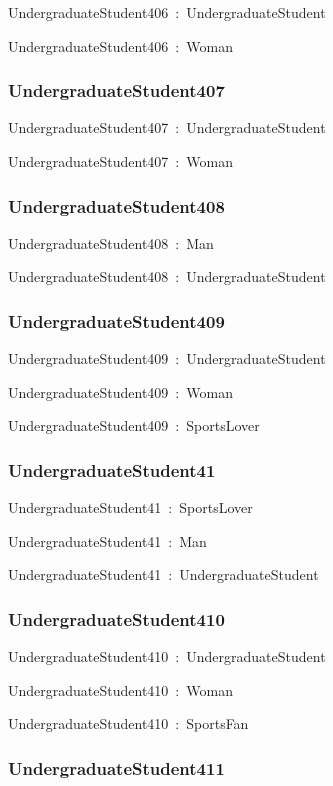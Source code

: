 \documentclass{article}
\begin{document}
UndergraduateStudent406~:~UndergraduateStudent

UndergraduateStudent406~:~Woman

\subsubsection*{UndergraduateStudent407}

UndergraduateStudent407~:~UndergraduateStudent

UndergraduateStudent407~:~Woman

\subsubsection*{UndergraduateStudent408}

UndergraduateStudent408~:~Man

UndergraduateStudent408~:~UndergraduateStudent

\subsubsection*{UndergraduateStudent409}

UndergraduateStudent409~:~UndergraduateStudent

UndergraduateStudent409~:~Woman

UndergraduateStudent409~:~SportsLover

\subsubsection*{UndergraduateStudent41}

UndergraduateStudent41~:~SportsLover

UndergraduateStudent41~:~Man

UndergraduateStudent41~:~UndergraduateStudent

\subsubsection*{UndergraduateStudent410}

UndergraduateStudent410~:~UndergraduateStudent

UndergraduateStudent410~:~Woman

UndergraduateStudent410~:~SportsFan

\subsubsection*{UndergraduateStudent411}
\end{document}
